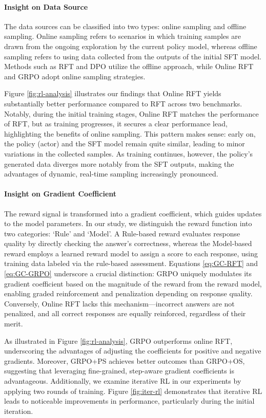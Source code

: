 \begin{itemize}[topsep=0pt]
\paragraph{Insight on Data Source} The data sources can be classified into two types: online sampling and offline sampling. Online sampling refers to scenarios in which training samples are drawn from the ongoing exploration by the current policy model, whereas offline sampling refers to using data collected from the outputs of the initial SFT model. Methods such as RFT and DPO utilize the offline approach, while Online RFT and GRPO adopt online sampling strategies.

Figure \ref{fig:rl-analysis} illustrates our findings that Online RFT yields substantially better performance compared to RFT across two benchmarks. Notably, during the initial training stages, Online RFT matches the performance of RFT, but as training progresses, it secures a clear performance lead, highlighting the benefits of online sampling. This pattern makes sense: early on, the policy (actor) and the SFT model remain quite similar, leading to minor variations in the collected samples. As training continues, however, the policy’s generated data diverges more notably from the SFT outputs, making the advantages of dynamic, real-time sampling increasingly pronounced.

\paragraph{Insight on Gradient Coefficient} The reward signal is transformed into a gradient coefficient, which guides updates to the model parameters. In our study, we distinguish the reward function into two categories: `Rule' and `Model'. A Rule-based reward evaluates response quality by directly checking the answer’s correctness, whereas the Model-based reward employs a learned reward model to assign a score to each response, using training data labeled via the rule-based assessment. Equations \ref{eq:GC-RFT} and \ref{eq:GC-GRPO} underscore a crucial distinction: GRPO uniquely modulates its gradient coefficient based on the magnitude of the reward from the reward model, enabling graded reinforcement and penalization depending on response quality. Conversely, Online RFT lacks this mechanism—incorrect answers are not penalized, and all correct responses are equally reinforced, regardless of their merit.

As illustrated in Figure \ref{fig:rl-analysis}, GRPO outperforms online RFT, underscoring the advantages of adjusting the coefficients for positive and negative gradients. Moreover, GRPO+PS achieves better outcomes than GRPO+OS, suggesting that leveraging fine-grained, step-aware gradient coefficients is advantageous. Additionally, we examine iterative RL in our experiments by applying two rounds of training. Figure \ref{fig:iter-rl} demonstrates that iterative RL leads to noticeable improvements in performance, particularly during the initial iteration.


\end{itemize}

